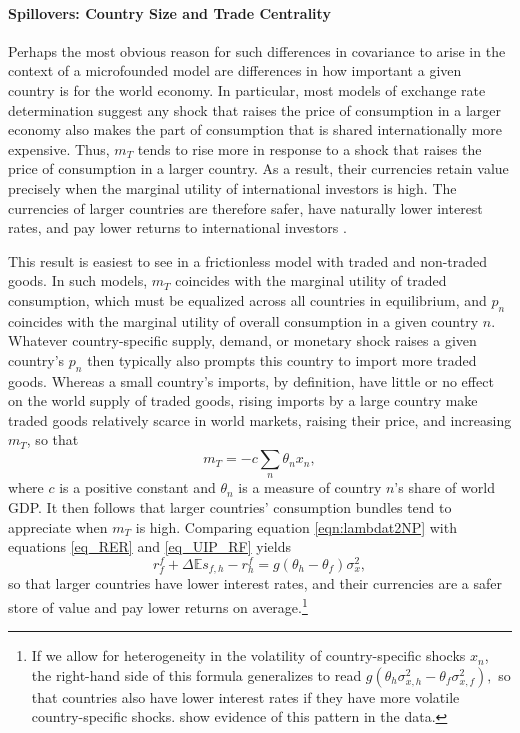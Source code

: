 \documentclass{ar-1col}
\begin{document}
\paragraph*{Spillovers: Country Size and Trade Centrality}

Perhaps the most obvious reason for such differences in covariance to arise in the context of a microfounded model are differences in how important a given country is for the world economy. In particular, most models of exchange rate determination suggest any shock that raises the price of consumption in a larger economy also makes the part of consumption that is shared internationally more expensive. Thus, $m_T$ tends to rise more in response to a shock that raises the price of consumption in a larger country. As a result, their currencies retain value precisely when the marginal utility of international investors is high. The currencies of larger countries are therefore safer, have naturally lower interest rates, and pay lower returns to international investors \citep{Martin2012, Hassan2013}.

This result is easiest to see in a frictionless model with traded and non-traded goods. In such models, $m_T$ coincides with the marginal utility of traded consumption, which must be equalized across all countries in equilibrium, and $p_n$ coincides with the marginal utility of overall consumption in a given country $n$. Whatever country-specific supply, demand, or monetary shock raises a given country's $p_n$ then typically also prompts this country to import more traded goods. Whereas a small country's imports, by definition, have little or no effect on the world supply of traded goods, rising imports by a large country make traded goods relatively scarce in world markets, raising their price, and increasing $m_T$, so that
\begin{equation} 
    m_{T} = -c \sum_{n} \theta_n x_n,
    \label{eqn:lambdat2NP}
\end{equation}
where $c$ is a positive constant and $\theta_n$ is a measure of country $n$'s share of world GDP. It then follows that larger countries' consumption bundles tend to appreciate when $m_T$ is high. Comparing equation \ref{eqn:lambdat2NP} with equations \ref{eq_RER} and \ref{eq_UIP_RF} yields
\begin{equation}
  r^f_f + \Delta \mathbb{E} s_{f, h} - r^f_h
  =g\left(\theta_h - \theta_f\right) \sigma_x^2,
  \label{eq_FF_UIP}
\end{equation}
so that larger countries have lower interest rates, and their currencies are a safer store of value and pay lower returns on average.\footnote{If we allow for heterogeneity in the volatility of country-specific shocks $x_n$, the right-hand side of this formula generalizes to read $g(\theta_h \sigma_{x,h}^2 - \theta_f \sigma_{x,f}^2),$ so that countries also have lower interest rates if they have more volatile country-specific shocks. \cite{to2020nontraded} show evidence of this pattern in the data.  }
  
\end{document}
